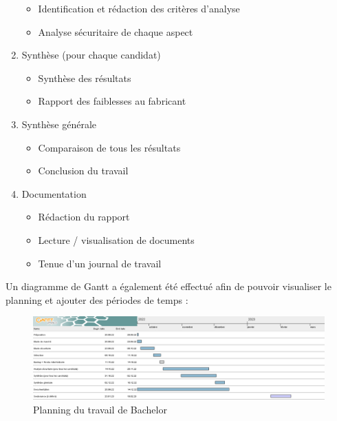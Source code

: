 \begin{enumerate}
		\begin{itemize}
			\item Identification et rédaction des critères d'analyse 
			\item Analyse sécuritaire de chaque aspect
		\end{itemize}
	\item Synthèse (pour chaque candidat)
		\begin{itemize}
			\item Synthèse des résultats
			\item Rapport des faiblesses au fabricant
		\end{itemize}
	\item Synthèse générale
		\begin{itemize}
			\item Comparaison de tous les résultats
			\item Conclusion du travail
		\end{itemize}
	\item Documentation
		\begin{itemize}
			\item Rédaction du rapport
			\item Lecture / visualisation de documents
			\item Tenue d'un journal de travail
		\end{itemize}
\end{enumerate}

Un diagramme de Gantt a également été effectué afin de pouvoir visualiser le planning et ajouter des périodes de temps :
\begin{figure}[h!]
	\includegraphics[width=15.5cm]{images/planning.png}
	\caption{Planning du travail de Bachelor}
\end{figure}